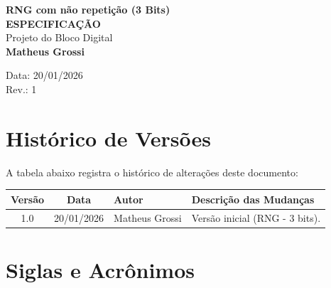 \documentclass[12pt, a4paper]{article}
\begin{document}
	
	\begin{titlepage}
		\centering
		\vspace*{2cm}
		
		{\LARGE \textbf{RNG com não repetição (3 Bits)}}\\[0.5cm]
		{\Huge \textbf{ESPECIFICAÇÃO}}\\[1.5cm]
		
		{\Large Projeto do Bloco Digital}\\[2cm]
		
		{\Large \textbf{Matheus Grossi}}\\[3cm]
		
		\vfill
		
		Data: 20/01/2026\\
		Rev.: 1
		
		\vspace*{1cm}
	\end{titlepage}
	
	\section*{Histórico de Versões}
	
	A tabela abaixo registra o histórico de alterações deste documento:
	
	\begin{table}[h]
		\centering
		\begin{tabularx}{\textwidth}{|c|c|X|X|}
			\hline
			\textbf{Versão} & \textbf{Data} & \textbf{Autor} & \textbf{Descrição das Mudanças} \\
			\hline
			1.0 & 20/01/2026 & Matheus Grossi & Versão inicial (RNG - 3 bits). \\
			\hline
		\end{tabularx}
	\end{table}
	
	\section*{Siglas e Acrônimos}
	
\end{document}

